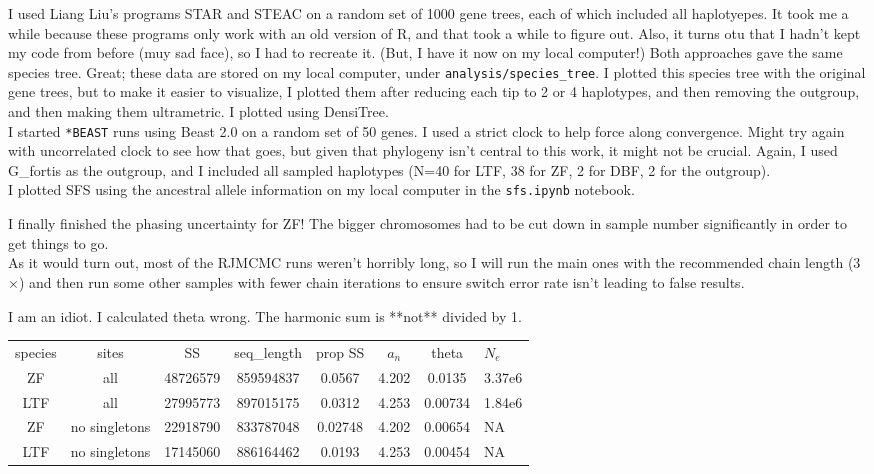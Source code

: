 \documentclass[idxtotoc,hyperref,openany,oneside]{labbook} %
\begin{document}
I used Liang Liu's programs STAR and STEAC on a random set of 1000 gene trees, each of which included all haplotyepes. It took me a while because these programs only work with an old version of R, and that took a while to figure out. Also, it turns otu that I hadn't kept my code from before (muy sad face), so I had to recreate it. (But, I have it now on my local computer!) Both approaches gave the same species tree. Great; these data are stored on my local computer, under \verb+analysis/species_tree+. I plotted this species tree with the original gene trees, but to make it easier to visualize, I plotted them after reducing each tip to 2 or 4 haplotypes, and then removing the outgroup, and then making them ultrametric. I plotted using DensiTree. \\

I started \verb+*BEAST+ runs using Beast 2.0 on a random set of 50 genes. I used a strict clock to help force along convergence. Might try again with uncorrelated clock to see how that goes, but given that phylogeny isn't central to this work, it might not be crucial. Again, I used G\_fortis as the outgroup, and I included all sampled haplotypes (N=40 for LTF, 38 for ZF, 2 for DBF, 2 for the outgroup). \\

I plotted SFS using the ancestral allele information on my local computer in the \verb+sfs.ipynb+ notebook.

I finally finished the phasing uncertainty for ZF! The bigger chromosomes had to be cut down in sample number significantly in order to get things to go. \\

As it would turn out, most of the RJMCMC runs weren't horribly long, so I will run the main ones with the recommended chain length (3$\times$) and then run some other samples with fewer chain iterations to ensure switch error rate isn't leading to false results.

I am an idiot. I calculated theta wrong. The harmonic sum is **not** divided by 1.
\begin{tabular}{ c c c c c c c}
species & sites & SS & seq_length & prop SS & $a_n$ & theta & $N_e$ \\
ZF  & all & 48726579 & 859594837 & 0.0567 & 4.202 & 0.0135 & 3.37e6 \\
LTF & all & 27995773 & 897015175 & 0.0312 & 4.253 & 0.00734 & 1.84e6 \\
ZF & no singletons & 22918790 & 833787048 & 0.02748 & 4.202 & 0.00654 & NA \\
LTF & no singletons & 17145060 & 886164462 & 0.0193 & 4.253 & 0.00454 & NA \\
\end{tabular}
\end{document}
